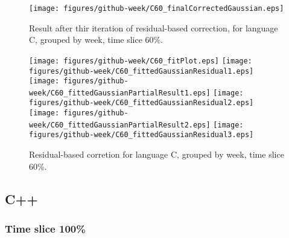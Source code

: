 \begin{figure}[]
\centering
{\texttt{[image: figures/github-week/C60\_finalCorrectedGaussian.eps]}}
\caption{Result after thir iteration of residual-based correction, for language C, grouped by week, time slice 60\%.}
\end{figure}


\begin{figure}[hb]
\centering
{}
{\texttt{[image: figures/github-week/C60\_fitPlot.eps]}}
{\texttt{[image: figures/github-week/C60\_fittedGaussianResidual1.eps]}}
{\texttt{[image: figures/github-week/C60\_fittedGaussianPartialResult1.eps]}}
{\texttt{[image: figures/github-week/C60\_fittedGaussianResidual2.eps]}}
{\texttt{[image: figures/github-week/C60\_fittedGaussianPartialResult2.eps]}}
{\texttt{[image: figures/github-week/C60\_fittedGaussianResidual3.eps]}}
\caption{Residual-based corretion for language C, grouped by week, time slice 60\%.}
\end{figure}


\clearpage 
\newpage 


\subsection{C++}

\FloatBarrier

\subsubsection{Time slice 100\%}

